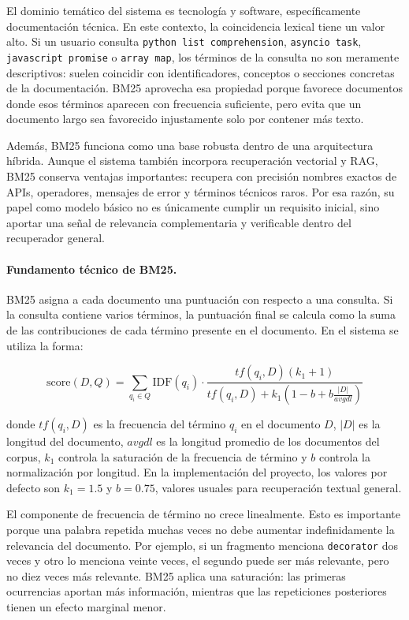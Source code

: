 \documentclass[11pt]{article}
\begin{document}
El dominio temático del sistema es tecnología y software, específicamente documentación técnica.
En este contexto, la coincidencia lexical tiene un valor alto. Si un usuario consulta
\texttt{python list comprehension}, \texttt{asyncio task}, \texttt{javascript promise} o
\texttt{array map}, los términos de la consulta no son meramente descriptivos: suelen coincidir
con identificadores, conceptos o secciones concretas de la documentación. BM25 aprovecha esa
propiedad porque favorece documentos donde esos términos aparecen con frecuencia suficiente,
pero evita que un documento largo sea favorecido injustamente solo por contener más texto.

Además, BM25 funciona como una base robusta dentro de una arquitectura híbrida. Aunque el sistema
también incorpora recuperación vectorial y RAG, BM25 conserva ventajas importantes: recupera con
precisión nombres exactos de APIs, operadores, mensajes de error y términos técnicos raros. Por
esa razón, su papel como modelo básico no es únicamente cumplir un requisito inicial, sino aportar
una señal de relevancia complementaria y verificable dentro del recuperador general.

\paragraph{Fundamento técnico de BM25.}
BM25 asigna a cada documento una puntuación con respecto a una consulta. Si la consulta contiene
varios términos, la puntuación final se calcula como la suma de las contribuciones de cada término
presente en el documento. En el sistema se utiliza la forma:

\[
\mathrm{score}(D,Q) =
\sum_{q_i \in Q}
\mathrm{IDF}(q_i)
\cdot
\frac{tf(q_i,D)(k_1+1)}
{tf(q_i,D) + k_1\left(1-b+b\frac{|D|}{avgdl}\right)}
\]

donde \(tf(q_i,D)\) es la frecuencia del término \(q_i\) en el documento \(D\), \(|D|\) es la
longitud del documento, \(avgdl\) es la longitud promedio de los documentos del corpus, \(k_1\)
controla la saturación de la frecuencia de término y \(b\) controla la normalización por longitud.
En la implementación del proyecto, los valores por defecto son \(k_1=1.5\) y \(b=0.75\), valores
usuales para recuperación textual general.

El componente de frecuencia de término no crece linealmente. Esto es importante porque una
palabra repetida muchas veces no debe aumentar indefinidamente la relevancia del documento. Por
ejemplo, si un fragmento menciona \texttt{decorator} dos veces y otro lo menciona veinte veces,
el segundo puede ser más relevante, pero no diez veces más relevante. BM25 aplica una saturación:
las primeras ocurrencias aportan más información, mientras que las repeticiones posteriores
tienen un efecto marginal menor.
\end{document}
